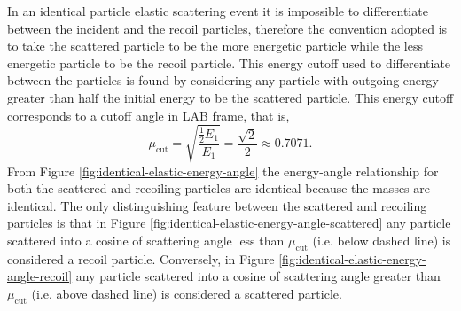 \documentclass[../main.tex]{subfiles}
\begin{document}
In an identical particle elastic scattering event it is impossible to differentiate between the incident and the recoil particles, therefore the convention adopted is to take the scattered particle to be the more energetic particle while the less energetic particle to be the recoil particle. This energy cutoff used to differentiate between the particles is found by considering any particle with outgoing energy greater than half the initial energy to be the scattered particle. This energy cutoff corresponds to a cutoff angle in LAB frame, that is,
\begin{equation}
  \mu_{\text{cut}} = \sqrt{\dfrac{\frac{1}{2} E_1}{E_1}} = \dfrac{\sqrt{2}}{2} \approx 0.7071.
\end{equation}
From Figure \ref{fig:identical-elastic-energy-angle} the energy-angle relationship for both the scattered and recoiling particles are identical because the masses are identical. The only distinguishing feature between the scattered and recoiling particles is that in Figure \ref{fig:identical-elastic-energy-angle-scattered} any particle scattered into a cosine of scattering angle less than $\mu_{\text{cut}}$ (i.e. below dashed line) is considered a recoil particle. Conversely, in Figure \ref{fig:identical-elastic-energy-angle-recoil} any particle scattered into a cosine of scattering angle greater than $\mu_{\text{cut}}$ (i.e. above dashed line) is considered a scattered particle.
\end{document}
